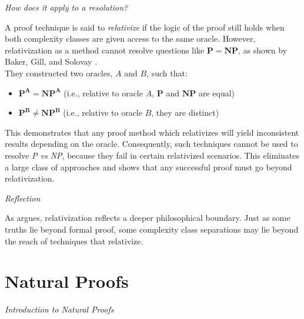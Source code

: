 \documentclass[12pt]{report}
\begin{document}
\begin{center}
    \vspace{0cm}
    {\Large\itshape How does it apply to a resolution?\par}
\end{center}
A proof technique is said to \textit{relativize} if the logic of the proof still holds when both complexity classes are given access to the same oracle.
However, relativization as a method cannot resolve questions like $\mathbf{P = NP}$, as shown by Baker, Gill, and Solovay \cite{baker1975relativizations}.\\
They constructed two oracles, $A$ and $B$, such that:
\begin{itemize}
    \item $\mathbf{P^A = NP^A}$ (i.e., relative to oracle $A$, $\mathbf{P}$ and $\mathbf{NP}$ are equal)
    \item $\mathbf{P^B \neq NP^B}$ (i.e., relative to oracle $B$, they are distinct)
\end{itemize}
This demonstrates that any proof method which relativizes will yield inconsistent results depending on the oracle.
Consequently, such techniques cannot be used to resolve \textit{P vs NP}, because they fail in certain relativized scenarios.
This eliminates a large class of approaches and shows that any successful proof must go beyond relativization.

\begin{center}
    \vspace{0cm}
    {\Large\itshape Reflection\par}
\end{center}
As \cite{aaronson2005philosophers} argues, relativization reflects a deeper philosophical boundary.
Just as some truths lie beyond formal proof, some complexity class separations may lie beyond the reach of techniques that relativize.

\section*{Natural Proofs}
\begin{center}
    \vspace{0cm}
    {\Large\itshape Introduction to Natural Proofs\par}
\end{center}
\end{document}
